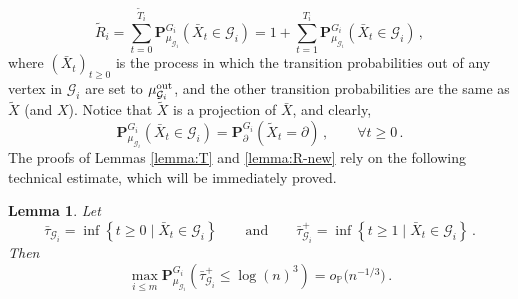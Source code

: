 \documentclass[11pt,oneside]{amsart}
\numberwithin{equation}{section}  %
\theoremstyle{plain}
\newtheorem{lemma}[theorem]{Lemma}
\newcommand{\p}{\mathbb{P}}
\newcommand{\op}{o_{\p}}
\newcommand{\quench}{\mathbf{P}}
\newcommand{\gates}{\mathcal{G}}
\newcommand{\mub}{\mu_{\gates_i}}
\newcommand{\muout}{\mu^{\rm out}_{\gates_i}}
\begin{document}
 \begin{equation}
	\tilde{R}_i=\sum_{t=0}^{\tilde{T}_i}{\quench}^{G_i}_{\mub}(\bar X_t\in\gates_i)=1+\sum_{t=1}^{T_i}{\quench}^{G_i}_{\mub}(\bar X_t\in\gates_i)\,,
\end{equation}
where $(\bar X_t)_{t\ge 0}$ is the process in which the transition probabilities out of any vertex in $\gates_i$ are set to $\muout$, and the other transition probabilities are the same as $\tilde X$ (and $X$).
Notice that $\tilde X$ is a projection of $\bar X$, and clearly, 
\begin{equation}
	{\quench}^{G_i}_{\mub}(\bar X_t\in\gates_i)={\quench}^{G_i}_{\partial}(\tilde X_t=\partial)\,,\qquad \forall t\ge 0\,.
\end{equation}
The proofs of Lemmas \ref{lemma:T} and \ref{lemma:R-new} rely on the following technical estimate, which will be immediately proved.%
\begin{lemma}\label{lemma:key}
	Let
	\begin{equation}\label{eq:bar-tau}
		\bar\tau_{\gates_i}=\inf\left\{t\ge 0\mid \bar X_t\in\gates_i \right\}\qquad\text{and}\qquad 	\bar\tau_{\gates_i}^+=\inf\left\{t\ge 1\mid \bar X_t\in\gates_i \right\}\,.
	\end{equation}
	Then
\begin{equation}\label{eq:return-to-gates}
	\max_{i \le m}{\quench}^{G_i}_{\mub} (\bar\tau_{\gates_i}^+\le \log(n)^3)=\op\big(n^{-1/3}\big)\,.
\end{equation}
\end{lemma}
\end{document}
